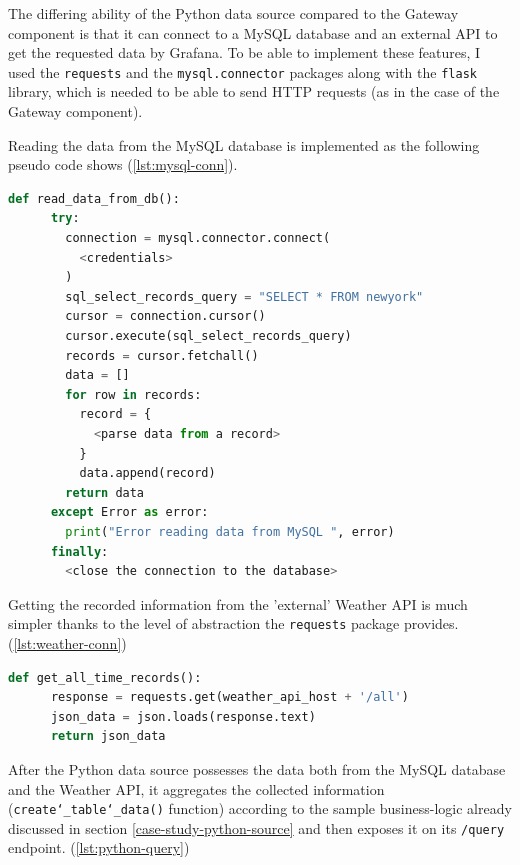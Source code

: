 The differing ability of the Python data source compared to the Gateway  component is that it can connect to a MySQL database and an external API to get the requested data by Grafana. To be able to implement these features, I used the \texttt{requests} and the \texttt{mysql.connector} packages along with the \texttt{flask} library, which is needed to be able to send HTTP requests (as in the case of the Gateway component).


Reading the data from the MySQL database is implemented as the following pseudo code shows (\ref{lst:mysql-conn}).

\begin{minipage}[b]{\linewidth}
	\centering
	\begin{lstlisting}[language=Python, frame=single, mathescape,%
	caption={Reading data from MySQL}, label=lst:mysql-conn]
	def read_data_from_db():
	  try:
	    connection = mysql.connector.connect(
	      <credentials>
	    )
	    sql_select_records_query = "SELECT * FROM newyork"
	    cursor = connection.cursor()
	    cursor.execute(sql_select_records_query)
	    records = cursor.fetchall()
	    data = []
	    for row in records:
	      record = {
	        <parse data from a record>
	      }
	      data.append(record)
	    return data
	  except Error as error:
	    print("Error reading data from MySQL ", error)
	  finally:
	    <close the connection to the database>
	\end{lstlisting}
\end{minipage}

Getting the recorded information from the 'external' Weather API is much simpler thanks to the level of abstraction the \texttt{requests} package provides. (\ref{lst:weather-conn})

\begin{minipage}[b]{\linewidth}
	\centering
	\begin{lstlisting}[language=Python, frame=single, mathescape,%
	caption={Reading data from the Weather API}, label=lst:weather-conn]
	def get_all_time_records():
	  response = requests.get(weather_api_host + '/all')
	  json_data = json.loads(response.text)
	  return json_data
	\end{lstlisting}
\end{minipage}

After the Python data source possesses the data both from the MySQL database and the Weather API, it aggregates the collected information (\texttt{create\char`_table\char`_data()} function) according to the sample business-logic already discussed in section \ref{case-study-python-source} and then exposes it on its \texttt{/query} endpoint. (\ref{lst:python-query})

